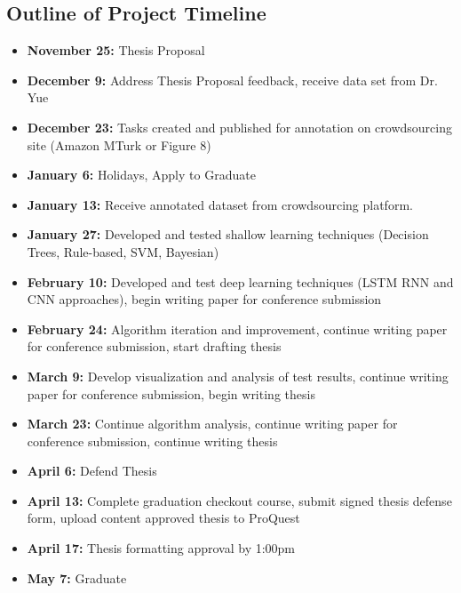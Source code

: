 \documentclass[letterpaper,12pt]{article}
\begin{document}
\subsection{Outline of Project Timeline}
\begin{itemize}
	\item \textbf{November 25:} Thesis Proposal
	\item \textbf{December 9:} Address Thesis Proposal feedback, receive data set from Dr. Yue
	\item \textbf{December 23:} Tasks created and published for annotation on crowdsourcing site (Amazon MTurk or Figure 8)
	\item \textbf{January 6:} Holidays, Apply to Graduate
	\item \textbf{January 13:} Receive annotated dataset from crowdsourcing platform.
	\item \textbf{January 27:} Developed and tested shallow learning techniques (Decision Trees, Rule-based, SVM, Bayesian)
	\item \textbf{February 10:} Developed and test deep learning techniques (LSTM RNN and CNN approaches), begin writing paper for conference submission
	\item \textbf{February 24:} Algorithm iteration and improvement, continue writing paper for conference submission, start drafting thesis
	\item \textbf{March 9:} Develop visualization and analysis of test results, continue writing paper for conference submission, begin writing thesis
	\item \textbf{March 23:} Continue algorithm analysis, continue writing paper for conference submission, continue writing thesis
	\item \textbf{April 6:} Defend Thesis
	\item \textbf{April 13:} Complete graduation checkout course, submit signed thesis defense form, upload content approved thesis to ProQuest
	\item \textbf{April 17:} Thesis formatting approval by 1:00pm
	\item \textbf{May 7:} Graduate
\end{itemize}

\end{document}
